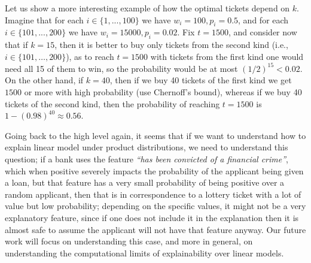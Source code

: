 Let us show a more interesting example of how the optimal tickets depend on $k$.
Imagine that for each $i \in \{1, ..., 100\}$ we have $w_i = 100, p_i = 0.5$, and for each $i \in \{101, ..., 200\}$ we have $w_i = 15000, p_i = 0.02$. Fix $t = 1500$, and consider now that if $k = 15$, then it is better to buy only tickets from the second kind (i.e., $i \in \{101, \ldots, 200\}$), as to reach $t=1500$ with tickets from the first kind one would need all 15 of them to win, so the probability would be at most $(1/2)^{15} < 0.02$.  On the other hand, if $k = 40$, then if we buy 40 tickets of the first kind we get $1500$ or more with high probability (use Chernoff's bound), whereas if we buy 40 tickets of the second kind, then the probability of reaching $t = 1500$ is $1 - (0.98)^{40} \approx 0.56$.

Going back to the high level again, it seems that if we want to understand how to explain linear model under product distributions, we need to understand this question; if a bank uses the feature \emph{``has been convicted of a financial crime''}, which when positive severely impacts the probability of the applicant being given a loan, but that feature has a very small probability of being positive over a random applicant, then that is in correspondence to a lottery ticket with a lot of value but low probability; depending on the specific values, it might not be a very explanatory feature, since if one does not include it in the explanation then it is almost safe to assume the applicant will not have that feature anyway. Our future work will focus on understanding this case, and more in general, on understanding the computational limits of explainability over linear models.